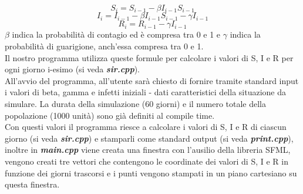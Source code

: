 \documentclass[a4paper,10 pt]{article}
\begin{document}
\[
S_i = S_{i - 1} - \beta I_{i - 1}S_{i - 1} 
\]
\[
I_i = I_{i - 1} - \beta I_{i - 1}S_{i - 1} - \gamma I_{i - 1}
\]
\[
R_i = R_{i - 1} - \gamma I_{i - 1}
 \]
$\beta$ indica la probabilità di contagio ed è compresa tra 0 e 1 e $\gamma$ indica la probabilità di guarigione, anch'essa compresa tra 0 e 1.
\ \\
Il nostro programma utilizza queste formule per calcolare i valori di S, I e R per ogni giorno i-esimo (si veda  \textbf{\textit{sir.cpp}}).
\ \\
All'avvio del programma, all'utente sarà chiesto di fornire tramite standard input i valori di beta, gamma e infetti iniziali - dati caratteristici della situazione da simulare. La durata della simulazione (60 giorni) e il numero totale della popolazione (1000 unità) sono già definiti al compile time.
\\ 
Con questi valori il programma riesce a calcolare i valori di S, I e R di ciascun giorno (si veda  \textbf{\textit{sir.cpp}}) e stamparli come standard output (si veda  \textbf{\textit{print.cpp}}), inoltre in \textbf{\textit{main.cpp}} viene creata una finestra con l'ausilio della libreria SFML, vengono creati tre vettori che contengono le coordinate dei valori di S, I e R in funzione dei giorni trascorsi e i punti vengono stampati in un piano cartesiano su questa finestra.
\end{document}
